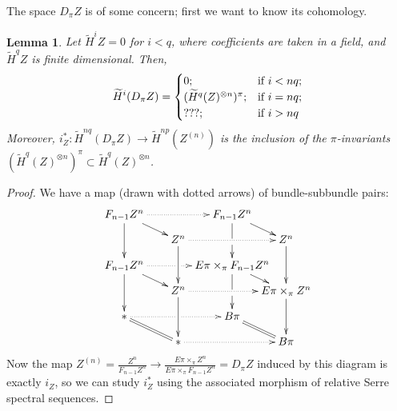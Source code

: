 \documentclass{article}
\newtheorem{lem}[thm]{Lemma}
\begin{document}
 

The space $D_\pi Z$ is of some concern; first we want to know its cohomology.
\begin{lem}
Let $\widetilde H^i Z = 0$ for $i < q$, where coefficients are taken in a field, and $\widetilde H^q Z$ is finite dimensional.  Then,
\[\widetilde H^i(D_\pi Z)=
\begin{cases}0;&\textup{if }i<nq;\\(\widetilde H^q(Z)^{\otimes n})^\pi;&\textup{if }i=nq;\\???;&\textup{if }i>nq\end{cases}
\]
Moreover, $i_Z^*:\widetilde H^{nq}(D_\pi Z)\to \widetilde H^{np}(Z^{(n)})$ is the inclusion of the $\pi$-invariants $(\widetilde H^q(Z)^{\otimes n})^\pi\subset\widetilde H^q(Z)^{\otimes n}$.
\end{lem}
\begin{proof}
We have a map (drawn with dotted arrows) of bundle-subbundle pairs:
\[\xymatrix@!0@C=1.7cm@R=.8cm{
F_{n-1}Z^n\ar[dd]\ar[rd]\ar@{.>}[rr]&&F_{n-1}Z^n\ar'[d][dd]\ar[rd]\\
&Z^n\ar[dd]\ar@{.>}[rr]&&\ar[dd]Z^n\\
F_{n-1}Z^n\ar[dd]\ar[rd]\ar@{.>}'[r][rr]&&E\pi\times_\pi F_{n-1}Z^n\ar'[d][dd]\ar[rd]\\
&Z^n\ar[dd]\ar@{.>}[rr]&&\ar[dd]E\pi\times_\pi Z^n\\
\ast\ar@{.>}'[r][rr]\ar@{=}[rd]&&B\pi\ar@{=}[rd]\\
&\ast\ar@{.>}[rr]&&B\pi
}\]
Now the map $Z^{(n)}=\frac{Z^n}{F_{n-1}Z^n}\longrightarrow\frac{E\pi \times_\pi Z^n}{E\pi \times_\pi F_{n-1}Z^n} = D_\pi Z$ induced by this diagram is exactly $i_Z$, so we can study $i^*_Z$ using the associated morphism of relative Serre spectral sequences.


\end{proof}
\end{document}
